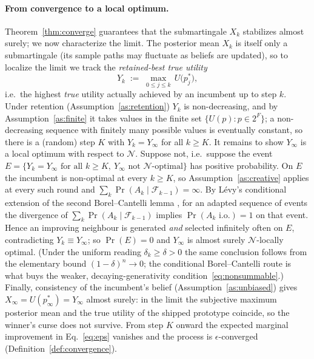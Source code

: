 \documentclass[11pt]{article}
\newcommand{\filt}{\mathcal{F}}     %
\begin{document}
\paragraph{From convergence to a local optimum.}
Theorem~\ref{thm:converge} guarantees that the submartingale $X_k$ stabilizes almost surely; we now characterize the limit. The posterior mean $X_k$ is itself only a submartingale (its sample paths may fluctuate as beliefs are updated), so to localize the limit we track the \emph{retained-best true utility}
\[
Y_k \;:=\; \max_{0\le j\le k}\, U\big(p_j^*\big),
\]
i.e.\ the highest \emph{true} utility actually achieved by an incumbent up to step $k$. Under retention (Assumption~\ref{as:retention}) $Y_k$ is non-decreasing, and by Assumption~\ref{as:finite} it takes values in the finite set $\{U(p):p\in 2^F\}$; a non-decreasing sequence with finitely many possible values is eventually constant, so there is a (random) step $K$ with $Y_k = Y_\infty$ for all $k\ge K$. It remains to show $Y_\infty$ is a local optimum with respect to $\mathcal{N}$. Suppose not, i.e.\ suppose the event $E=\{Y_k=Y_\infty \text{ for all }k\ge K,\ Y_\infty \text{ not } \mathcal{N}\text{-optimal}\}$ has positive probability. On $E$ the incumbent is non-optimal at every $k\ge K$, so Assumption~\ref{as:creative} applies at every such round and $\sum_k \Pr(A_k\mid\filt_{k-1})=\infty$. By L\'evy's conditional extension of the second Borel--Cantelli lemma \citep[Thm.~4.3.4]{durrett2019}, for an adapted sequence of events the divergence of $\sum_k\Pr(A_k\mid\filt_{k-1})$ implies $\Pr(A_k \text{ i.o.})=1$ on that event. Hence an improving neighbour is generated \emph{and} selected infinitely often on $E$, contradicting $Y_k\equiv Y_\infty$; so $\Pr(E)=0$ and $Y_\infty$ is almost surely $\mathcal{N}$-locally optimal. (Under the uniform reading $\delta_k\ge\delta>0$ the same conclusion follows from the elementary bound $(1-\delta)^n\to0$; the conditional Borel--Cantelli route is what buys the weaker, decaying-generativity condition~\eqref{eq:nonsummable}.) Finally, consistency of the incumbent's belief (Assumption~\ref{as:unbiased}) gives $X_\infty = U(p^*_\infty) = Y_\infty$ almost surely: in the limit the subjective maximum posterior mean and the true utility of the shipped prototype coincide, so the winner's curse does not survive. From step $K$ onward the expected marginal improvement in Eq.~\eqref{eq:eps} vanishes and the process is $\epsilon$-converged (Definition~\ref{def:convergence}).
\end{document}
